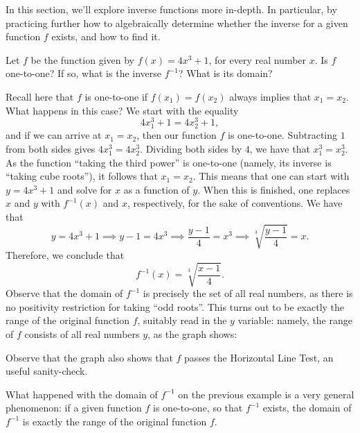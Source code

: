 \documentclass[nooutcomes]{ximera}
\begin{document}
In this section, we'll explore inverse functions more in-depth. In particular, by practicing further how to algebraically determine whether the inverse for a given function $f$ exists, and how to find it.

\begin{example}
  Let $f$ be the function given by $f(x) = 4x^3+1$, for every real number $x$. Is $f$ one-to-one? If so, what is the inverse $f^{-1}$? What is its domain?

  \begin{explanation}
    Recall here that $f$ is one-to-one if $f(x_1) = f(x_2)$ always implies that $x_1=x_2$. What happens in this case? We start with the equality $$4x_1^3+1 = 4x_2^3+1,$$ and if we can arrive at $x_1=x_2$, then our function $f$ is one-to-one. Subtracting $1$ from both sides gives $4x_1^3=4x_2^3$. Dividing both sides by $4$, we have that $x_1^3 = x_2^3$. As the function ``taking the third power'' is one-to-one (namely, its inverse is ``taking cube roots''), it follows that $x_1=x_2$. This means that one can start with $y=4x^3+1$ and solve for $x$ as a function of $y$. When this is finished, one replaces $x$ and $y$ with $f^{-1}(x)$ and $x$, respectively, for the sake of conventions. We have that $$y=4x^3+1 \implies y-1 = 4x^3 \implies \frac{y-1}{4} = x^3 \implies \sqrt[3]{\frac{y-1}{4}} = x.$$Therefore, we conclude that $$f^{-1}(x) = \sqrt[3]{\frac{x-1}{4}}.$$Observe that the domain of $f^{-1}$ is precisely the set of all real numbers, as there is no positivity restriction for taking ``odd roots''. This turns out to be exactly the range of the original function $f$, suitably read in the $y$ variable: namely, the range of $f$ consists of all real numbers $y$, as the graph shows:
\begin{image}
\end{image}
Observe that the graph also shows that $f$ passes the Horizontal Line Test, an useful sanity-check.
  \end{explanation}
\end{example}

\begin{callout}
  What happened with the domain of $f^{-1}$ on the previous example is a very general phenomenon: if a given function $f$ is one-to-one, so that $f^{-1}$ exists, the domain of $f^{-1}$ is exactly the range of the original function $f$.
\end{callout}
\end{document}
